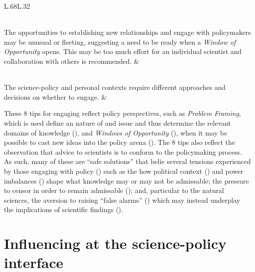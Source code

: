 \begin{table}[!ht]
\begin{tabular}{L{.68\linewidth}L{.32\linewidth}}
\rule{0pt}{4ex} \\
The opportunities to establishing new relationships and engage with policymakers may be unusual or fleeting, suggesting a need to be ready when a \emph{Window of Opportunity} opens. This may be too much effort for an individual scientist and collaboration with others is recommended.	 & 	\textcite{RoseBOP2018} \\ \hline
{}\rule{0pt}{4ex} \\
The science-policy and personal contexts require different approaches and decisions on whether to engage. & 	\textcite{OjanenBKP2021,Obermeister2022} \\
\hline
\end{tabular}
\end{table}

These 8 tips for engaging reflect policy perspectives, such as \emph{Problem Framing}, which is used define an nature of and issue and thus determine the relevant domains of knowledge (\cite{OECD2015,MoallemiZHSMZHKHMGLB2023}), and \emph{Windows of Opportunity} (\cite{Kingdon1993}), when it may be possible to cast new ideas into the policy arena (\cite{RoseBOP2018}). The 8 tips also reflect the observation that advice to scientists is to conform to the policymaking process. As such, many of these are ``safe solutions'' that belie several tensions experienced by those engaging with policy (\cite{CairneyO2020}) such as the how political context (\cite{SaxonbergSL2023,WesselinkH2020}) and power imbalances (\cite{TurnhoutMWKL2020,OjanenBKP2021,StrassheimK2014}) shape what knowledge may or may not be admissable; the pressure to censor in order to remain admissable (\cite{Pearce2024,OjanenBKP2021}); and, particular to the natural sciences, the aversion to raising ``false alarms'' (\cite{ReadO2017,PoeS2023}) which may instead underplay the implications of \CAN{} scientific findings (\cite{CalverleyA2022}). 

\section{Influencing at the science-policy interface}\label{sec:litinfluencing}

